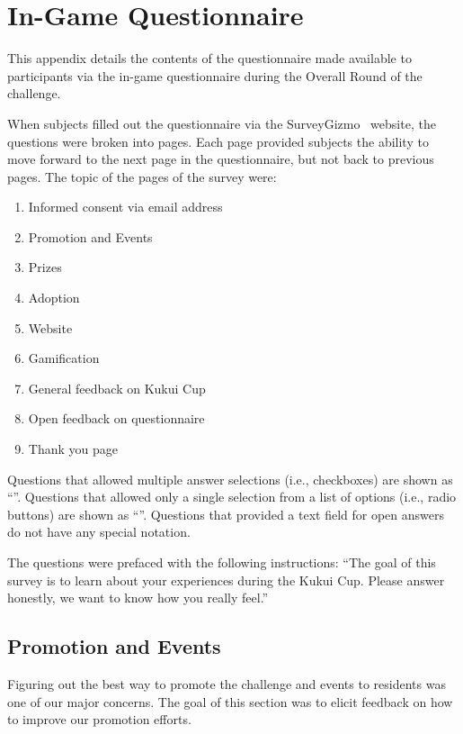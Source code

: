 \chapter{In-Game Questionnaire}
\label{app:in-game-questionnaire}

This appendix details the contents of the questionnaire made available to participants via the in-game questionnaire during the Overall Round of the challenge.

When subjects filled out the questionnaire via the SurveyGizmo~\cite{surveygizmo} website, the questions were broken into pages. Each page provided subjects the ability to move forward to the next page in the questionnaire, but not back to previous pages. The topic of the pages of the survey were:

\begin{enumerate}
	\item Informed consent via email address
	\item Promotion and Events
	\item Prizes
	\item Adoption
	\item Website
	\item Gamification
	\item General feedback on Kukui Cup
	\item Open feedback on questionnaire
	\item Thank you page
\end{enumerate}

Questions that allowed multiple answer selections (i.e., checkboxes) are shown as ``\Square''. Questions that allowed only a single selection from a list of options (i.e., radio buttons) are shown as ``\Circle''. Questions that provided a text field for open answers do not have any special notation.

The questions were prefaced with the following instructions: ``The goal of this survey is to learn about your experiences during the Kukui Cup. Please answer honestly, we want to know how you really feel.''

\section{Promotion and Events}

Figuring out the best way to promote the challenge and events to residents was one of our major concerns. The goal of this section was to elicit feedback on how to improve our promotion efforts.

